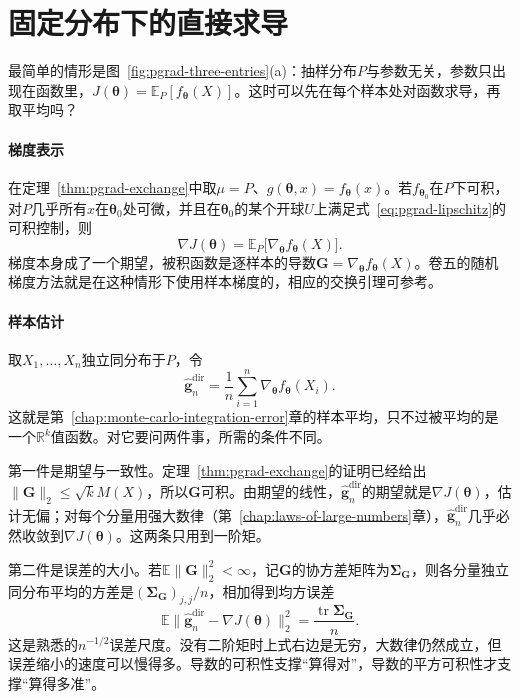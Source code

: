\section{固定分布下的直接求导}
\label{sec:pgrad-direct}

最简单的情形是图~\ref{fig:pgrad-three-entries}(a)：抽样分布$P$与参数无关，参数只出现在函数里，$J(\bm{\theta})=\mathbb{E}_{P}[f_{\bm{\theta}}(X)]$。这时可以先在每个样本处对函数求导，再取平均吗？

\paragraph{梯度表示}

在定理~\ref{thm:pgrad-exchange}中取$\mu=P$、$g(\bm{\theta},x)=f_{\bm{\theta}}(x)$。若$f_{\bm{\theta}_{0}}$在$P$下可积，对$P$几乎所有$x$在$\bm{\theta}_{0}$处可微，并且在$\bm{\theta}_{0}$的某个开球$U$上满足式~\eqref{eq:pgrad-lipschitz}的可积控制，则
\begin{equation}
  \nabla J(\bm{\theta})=\mathbb{E}_{P}\bigl[\nabla_{\bm{\theta}}f_{\bm{\theta}}(X)\bigr].
  \label{eq:pgrad-direct}
\end{equation}
梯度本身成了一个期望，被积函数是逐样本的导数$\bm{G}=\nabla_{\bm{\theta}}f_{\bm{\theta}}(X)$。卷五的随机梯度方法就是在这种情形下使用样本梯度的，相应的交换引理可参考。

\paragraph{样本估计}

取$X_{1},\dots,X_{n}$独立同分布于$P$，令
\begin{equation}
  \hat{\bm{g}}_{n}^{\mathrm{dir}}=\frac{1}{n}\sum_{i=1}^{n}\nabla_{\bm{\theta}}f_{\bm{\theta}}(X_{i}).
  \label{eq:pgrad-direct-estimator}
\end{equation}
这就是第~\ref{chap:monte-carlo-integration-error}章的样本平均，只不过被平均的是一个$\mathbb{R}^{k}$值函数。对它要问两件事，所需的条件不同。

第一件是期望与一致性。定理~\ref{thm:pgrad-exchange}的证明已经给出$\lVert\bm{G}\rVert_{2}\leq\sqrt{k}M(X)$，所以$\bm{G}$可积。由期望的线性，$\hat{\bm{g}}_{n}^{\mathrm{dir}}$的期望就是$\nabla J(\bm{\theta})$，估计无偏；对每个分量用强大数律（第~\ref{chap:laws-of-large-numbers}章），$\hat{\bm{g}}_{n}^{\mathrm{dir}}$几乎必然收敛到$\nabla J(\bm{\theta})$。这两条只用到一阶矩。

第二件是误差的大小。若$\mathbb{E}\lVert\bm{G}\rVert_{2}^{2}<\infty$，记$\bm{G}$的协方差矩阵为$\bm{\Sigma}_{\bm{G}}$，则各分量独立同分布平均的方差是$(\bm{\Sigma}_{\bm{G}})_{j,j}/n$，相加得到均方误差
\begin{equation}
  \mathbb{E}\bigl\lVert\hat{\bm{g}}_{n}^{\mathrm{dir}}-\nabla J(\bm{\theta})\bigr\rVert_{2}^{2}=\frac{\operatorname{tr}\bm{\Sigma}_{\bm{G}}}{n}.
  \label{eq:pgrad-direct-mse}
\end{equation}
这是熟悉的$n^{-1/2}$误差尺度。没有二阶矩时上式右边是无穷，大数律仍然成立，但误差缩小的速度可以慢得多。导数的可积性支撑“算得对”，导数的平方可积性才支撑“算得多准”。


